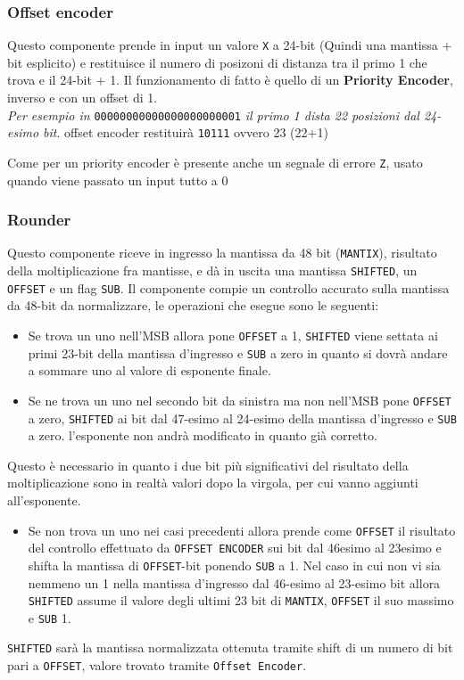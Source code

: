 \documentclass[twoside,11pt]{article}
\begin{document}
{\subsubsection{Offset encoder}
Questo componente prende in input un valore \verb|X| a 24-bit (Quindi una mantissa + bit esplicito) e restituisce il numero di posizoni di distanza tra il primo 1 che trova e il 24-bit + 1.
Il funzionamento di fatto è quello di un \textbf{Priority Encoder}, inverso e con un offset di 1.\\
\textit{Per esempio in} \verb|00000000000000000000001| \textit{il primo 1 dista 22 posizioni dal 24-esimo bit}. offset encoder restituirà \verb|10111| ovvero 23 (22+1)

Come per un priority encoder è presente anche un segnale di errore \verb|Z|, usato quando viene passato un input tutto a 0


\subsubsection{Rounder}
Questo componente riceve in ingresso la mantissa da 48 bit (\verb|MANTIX|), risultato della moltiplicazione fra mantisse, e dà in uscita una mantissa \verb|SHIFTED|, un \verb|OFFSET| e un flag \verb|SUB|.
Il componente compie un controllo accurato sulla mantissa da 48-bit da normalizzare, le operazioni che esegue sono le seguenti:
\begin{itemize}[noitemsep]
    \item Se trova un uno nell'MSB allora pone \verb|OFFSET| a 1, \verb|SHIFTED| viene settata ai primi 23-bit della mantissa d’ingresso e \verb|SUB| a zero in quanto si dovrà andare a sommare uno al valore di esponente finale.
    \item Se ne trova un uno nel secondo bit da sinistra ma non nell’MSB pone \verb|OFFSET| a zero, \verb|SHIFTED| ai bit dal 47-esimo al 24-esimo della mantissa d’ingresso e \verb|SUB| a zero. l’esponente non andrà modificato in quanto già corretto.
\end{itemize}
Questo è necessario in quanto i due bit più significativi del risultato della moltiplicazione sono in realtà valori dopo la virgola, per cui vanno aggiunti all’esponente.
\begin{itemize}[noitemsep]
    \item Se non trova un uno nei casi precedenti allora prende come \verb|OFFSET| il risultato del controllo effettuato da \verb|OFFSET ENCODER| sui bit dal 46esimo al 23esimo e shifta la mantissa di \verb|OFFSET|-bit ponendo \verb|SUB| a 1. Nel caso in cui non vi sia nemmeno un 1 nella mantissa d’ingresso dal 46-esimo al 23-esimo bit allora \verb|SHIFTED| assume il valore degli ultimi 23 bit di \verb|MANTIX|, \verb|OFFSET| il suo massimo e \verb|SUB| 1.
\end{itemize}
\verb|SHIFTED| sarà la mantissa normalizzata ottenuta tramite shift di un numero di bit pari a \verb|OFFSET|, valore trovato tramite \verb|Offset Encoder|.

}
\end{document}
